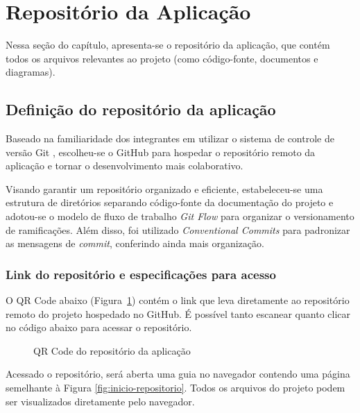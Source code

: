\section{Repositório da Aplicação}

Nessa seção do capítulo, apresenta-se o repositório da aplicação, que contém todos os arquivos relevantes ao projeto (como código-fonte, documentos e diagramas).

\subsection{Definição do repositório da aplicação}

Baseado na familiaridade dos integrantes em utilizar o sistema de controle de versão Git \cite{Git}, escolheu-se o GitHub \cite{GitHub} para hospedar o repositório remoto da aplicação e tornar o desenvolvimento mais colaborativo.

Visando garantir um repositório organizado e eficiente, estabeleceu-se uma estrutura de diretórios separando código-fonte da documentação do projeto e adotou-se o modelo de fluxo de trabalho \textit{Git Flow} \cite{GitFlow} para organizar o versionamento de ramificações. Além disso, foi utilizado \textit{Conventional Commits} \cite{ConventionalCommits} para padronizar as mensagens de \textit{commit}, conferindo ainda mais organização.

\subsubsection{Link do repositório e especificações para acesso}

O QR Code abaixo (Figura~\ref{fig:qrcode-repositorio}) contém o link que leva diretamente ao repositório remoto do projeto hospedado no GitHub. É possível tanto escanear quanto clicar no código abaixo para acessar o repositório.

\begin{figure}[h]
	\centering
		\caption{QR Code do repositório da aplicação}
		\label{fig:qrcode-repositorio}
\end{figure}

Acessado o repositório, será aberta uma guia no navegador contendo uma página semelhante à Figura \ref{fig:inicio-repositorio}. Todos os arquivos do projeto podem ser visualizados diretamente pelo navegador.


